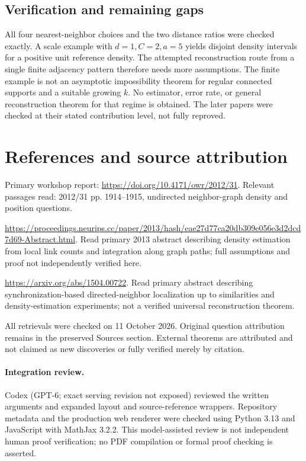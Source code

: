 \documentclass[11pt]{article}
\begin{document}
\subsection{Verification and remaining gaps}
All four nearest-neighbor choices and the two distance ratios were checked exactly. A scale example with $d=1,C=2,a=5$ yields disjoint density intervals for a positive unit reference density. The attempted reconstruction route from a single finite adjacency pattern therefore needs more assumptions. The finite example is not an asymptotic impossibility theorem for regular connected supports and a suitable growing $k$. No estimator, error rate, or general reconstruction theorem for that regime is obtained. The later papers were checked at their stated contribution level, not fully reproved.

\section{References and source attribution}
Primary workshop report: \url{https://doi.org/10.4171/owr/2012/31}. Relevant passages read: 2012/31 pp. 1914--1915, undirected neighbor-graph density and position questions.

\url{https://proceedings.neurips.cc/paper/2013/hash/eae27d77ca20db309e056e3d2dcd7d69-Abstract.html}. Read primary 2013 abstract describing density estimation from local link counts and integration along graph paths; full assumptions and proof not independently verified here.

\url{https://arxiv.org/abs/1504.00722}. Read primary abstract describing synchronization-based directed-neighbor localization up to similarities and density-estimation experiments; not a verified universal reconstruction theorem.

All retrievals were checked on 11 October 2026. Original question attribution remains in the preserved Sources section. External theorems are attributed and not claimed as new discoveries or fully verified merely by citation.


\paragraph{Integration review.} Codex (GPT-6; exact serving revision not exposed) reviewed the written arguments and expanded layout and source-reference wrappers. Repository metadata and the production web renderer were checked using Python 3.13 and JavaScript with MathJax 3.2.2. This model-assisted review is not independent human proof verification; no PDF compilation or formal proof checking is asserted.
\end{document}
